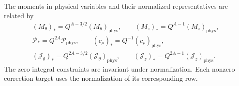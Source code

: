 The moments in physical variables and their normalized representatives are related by
\begin{equation}
\begin{gathered}
(M_\theta)_*=Q^{A-3/2}(M_\theta)_{\mathrm{phys}},
\qquad (M_z)_*=Q^{A-1}(M_z)_{\mathrm{phys}},\\
\mathcal P_*=Q^{2A}\mathcal P_{\mathrm{phys}},
\qquad (c_\rho)_*=Q^{-1}(c_\rho)_{\mathrm{phys}},\\
(\mathcal J_\theta)_*=Q^{2A-3/2}(\mathcal J_\theta)_{\mathrm{phys}},
\qquad (\mathcal J_z)_*=Q^{2A-1}(\mathcal J_z)_{\mathrm{phys}}.
\end{gathered}
\tag{8.17}\label{eq:8.17}
\end{equation}
The zero integral constraints are invariant under normalization. Each nonzero correction target uses
the normalization of its corresponding row.

